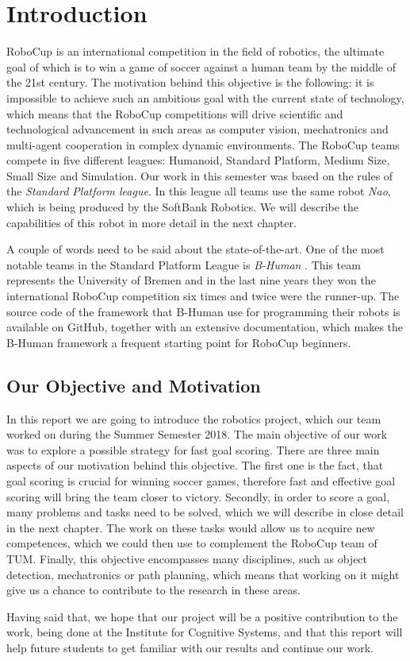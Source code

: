 \chapter{Introduction}

RoboCup \cite{robocup} is an international competition in the field of
robotics, the ultimate goal of which is to win a game of soccer against a human
team by the middle of the 21st century. The motivation behind this objective is
the following: it is impossible to achieve such an ambitious goal with the
current state of technology, which means that the RoboCup competitions will
drive scientific and technological advancement in such areas as computer
vision, mechatronics and multi-agent cooperation in complex dynamic
environments. The RoboCup teams compete in five different leagues: Humanoid,
Standard Platform, Medium Size, Small Size and Simulation. Our work in this
semester was based on the rules of the \textit{Standard Platform league}. In
this league all teams use the same robot \textit{Nao}, which is being produced
by the SoftBank Robotics. We will describe the capabilities of this robot in
more detail in the next chapter.

A couple of words need to be said about the state-of-the-art. One of the most
notable teams in the Standard Platform League is \textit{B-Human}
\cite{bhuman}. This team represents the University of Bremen and in the last
nine years they won the international RoboCup competition six times and twice
were the runner-up. The source code of the framework that B-Human use for
programming their robots is available on GitHub, together with an extensive
documentation, which makes the B-Human framework a frequent starting point for
RoboCup beginners.

\section{Our Objective and Motivation}
\label{sec problem statement}

In this report we are going to introduce the robotics project, which our team
worked on during the Summer Semester 2018. The main objective of our work was
to explore a possible strategy for fast goal scoring. There are three main
aspects of our motivation behind this objective. The first one is the fact,
that goal scoring is crucial for winning soccer games, therefore fast and
effective goal scoring will bring the team closer to victory. Secondly, in
order to score a goal, many problems and tasks need to be solved, which we will
describe in close detail in the next chapter. The work on these tasks would
allow us to acquire new competences, which we could then use to complement the
RoboCup team of TUM. Finally, this objective encompasses many disciplines, such
as object detection, mechatronics or path planning, which means that working on
it might give us a chance to contribute to the research in these areas.

Having said that, we hope that our project will be a positive contribution to
the work, being done at the Institute for Cognitive Systems, and that this
report will help future students to get familiar with our results and continue
our work.
